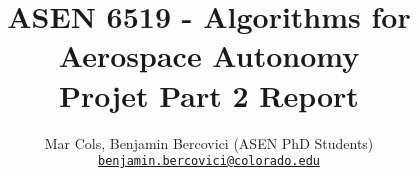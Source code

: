 \documentclass{report}
\title{ASEN 6519 - Algorithms for Aerospace Autonomy\\ Projet Part 2 Report}
\author{Mar Cols, Benjamin Bercovici (ASEN PhD Students)\\ \href{mailto:benjamin.bercovici@colorado.edu}{\nolinkurl{benjamin.bercovici@colorado.edu}}}
\begin{document}
\makeatletter
\renewcommand{\thesection}{\@arabic\c@section}
\makeatother
\maketitle
\tableofcontents
\newpage
\large

%



%
\end{document}
